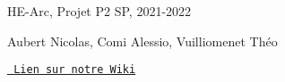 HE-\/\+Arc, Projet P2 SP, 2021-\/2022

Aubert Nicolas, Comi Alessio, Vuilliomenet Théo

\href{https://gitlab-etu.ing.he-arc.ch/isc/2021-22/niveau-2/2282-1-projet-p2-il-sp/g2/-/wikis/home}{\texttt{ Lien sur notre Wiki}} 